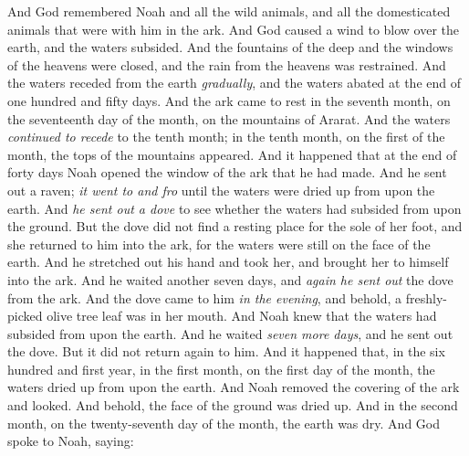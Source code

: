 \begin{biblechapter} %
 And God remembered Noah and all the wild animals, and all the domesticated animals that were with him in the ark. And God caused a wind to blow over the earth, and the waters subsided.
\verse And the fountains of the deep and the windows of the heavens were closed, and the rain from the heavens was restrained.
\verse And the waters receded from the earth \textit{gradually}, and the waters abated at the end of one hundred and fifty days.
\verse And the ark came to rest in the seventh month, on the seventeenth day of the month, on the mountains of Ararat.
\verse And the waters \textit{continued to recede} to the tenth month; in the tenth month, on the first of the month, the tops of the mountains appeared.
\verse And it happened that at the end of forty days Noah opened the window of the ark that he had made.
\verse And he sent out a raven; \textit{it went to and fro} until the waters were dried up from upon the earth.
\verse And \textit{he sent out a dove} to see whether the waters had subsided from upon the ground.
\verse But the dove did not find a resting place for the sole of her foot, and she returned to him into the ark, for the waters were still on the face of the earth. And he stretched out his hand and took her, and brought her to himself into the ark.
\verse And he waited another seven days, and \textit{again he sent out} the dove from the ark.
\verse And the dove came to him \textit{in the evening}, and behold, a freshly-picked olive tree leaf was in her mouth. And Noah knew that the waters had subsided from upon the earth.
\verse And he waited \textit{seven more days}, and he sent out the dove. But it did not return again to him.
\verse And it happened that, in the six hundred and first year, in the first month, on the first day of the month, the waters dried up from upon the earth. And Noah removed the covering of the ark and looked. And behold, the face of the ground was dried up.
\verse And in the second month, on the twenty-seventh day of the month, the earth was dry.
\verse And God spoke to Noah, saying:

\end{biblechapter}

